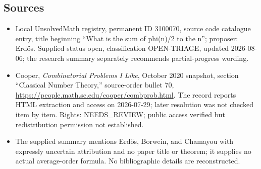 \documentclass[11pt]{article}
\begin{document}
\subsection{Sources}
\begin{itemize}
\item Local UnsolvedMath registry, permanent ID 3100070, source code catalogue entry, title beginning ``What is the sum of phi(n)/2 to the n''; proposer: Erd\H{o}s. Supplied status open, classification OPEN-TRIAGE, updated 2026-08-06; the research summary separately recommends partial-progress wording.
\item Cooper, \emph{Combinatorial Problems I Like}, October 2020 snapshot, section ``Classical Number Theory,'' source-order bullet 70, \url{https://people.math.sc.edu/cooper/combprob.html}. The record reports HTML extraction and access on 2026-07-29; later resolution was not checked item by item. Rights: NEEDS\_REVIEW; public access verified but redistribution permission not established.
\item The supplied summary mentions Erd\H{o}s, Borwein, and Chamayou with expressly uncertain attribution and no paper title or theorem; it supplies no actual average-order formula. No bibliographic details are reconstructed.
\end{itemize}
\end{document}
